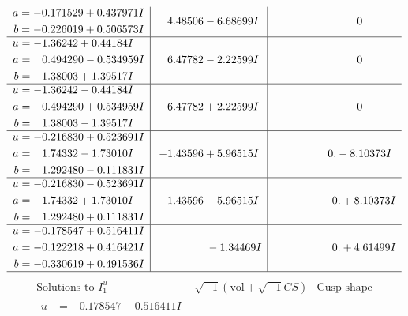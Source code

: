 \documentclass[1p]{elsarticle_modified}
\theoremstyle{definition}
\newcommand{\I}{\sqrt{-1}}
\begin{document}
$$\begin{array}{c|c|c}
\begin{aligned}
a &= -0.171529 + 0.437971 I \\
b &= -0.226019 + 0.506573 I\end{aligned}
 & \phantom{-}4.48506 - 6.68699 I & \phantom{-0.000000 } 0 \\ \hline\begin{aligned}
u &= -1.36242 + 0.44184 I \\
a &= \phantom{-}0.494290 - 0.534959 I \\
b &= \phantom{-}1.38003 + 1.39517 I\end{aligned}
 & \phantom{-}6.47782 - 2.22599 I & \phantom{-0.000000 } 0 \\ \hline\begin{aligned}
u &= -1.36242 - 0.44184 I \\
a &= \phantom{-}0.494290 + 0.534959 I \\
b &= \phantom{-}1.38003 - 1.39517 I\end{aligned}
 & \phantom{-}6.47782 + 2.22599 I & \phantom{-0.000000 } 0 \\ \hline\begin{aligned}
u &= -0.216830 + 0.523691 I \\
a &= \phantom{-}1.74332 - 1.73010 I \\
b &= \phantom{-}1.292480 - 0.111831 I\end{aligned}
 & -1.43596 + 5.96515 I & \phantom{-0.000000 } 0. - 8.10373 I \\ \hline\begin{aligned}
u &= -0.216830 - 0.523691 I \\
a &= \phantom{-}1.74332 + 1.73010 I \\
b &= \phantom{-}1.292480 + 0.111831 I\end{aligned}
 & -1.43596 - 5.96515 I & \phantom{-0.000000 -}0. + 8.10373 I \\ \hline\begin{aligned}
u &= -0.178547 + 0.516411 I \\
a &= -0.122218 + 0.416421 I \\
b &= -0.330619 + 0.491536 I\end{aligned}
 & \phantom{-0.000000 } -1.34469 I & \phantom{-0.000000 -}0. + 4.61499 I\\
 \hline 
 \end{array}$$\newpage$$\begin{array}{c|c|c}  
\text{Solutions to }I^u_{1}& \I (\text{vol} + \sqrt{-1}CS) & \text{Cusp shape}\\
 \hline 
\begin{aligned}
u &= -0.178547 - 0.516411 I \\

\end{aligned}
\end{array}$$
\end{document}
